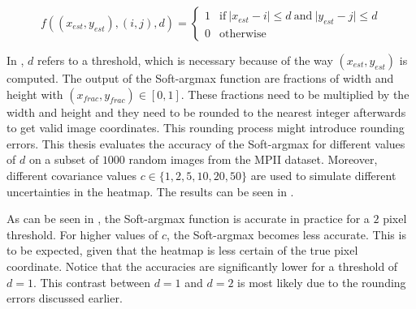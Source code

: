 \begin{equation}
    f((x_{est}, y_{est}), (i,j), d) =
    \begin{cases}
        1 & \text{if} ~ \lvert x_{est} - i \rvert \leq d ~ \text{and} ~ \lvert y_{est} - j \rvert \leq d \\
        0 & \text{otherwise}
    \end{cases}
    \label{eq:acc_softargmax}
\end{equation}

In , $d$ refers to a threshold, which is necessary because of the way $(x_{est}, y_{est})$ is computed.
The output of the Soft-argmax function are fractions of width and height with $(x_{frac}, y_{frac}) \in [0,1]$.
These fractions need to be multiplied by the width and height and they need to be rounded to the nearest integer afterwards to get valid image coordinates.
This rounding process might introduce rounding errors.
This thesis evaluates the accuracy of the Soft-argmax for different values of $d$ on a subset of $1000$ random images from the MPII dataset.
Moreover, different covariance values $c \in \{1, 2, 5, 10, 20, 50 \}$ are used to simulate different uncertainties in the heatmap.
The results can be seen in .

As can be seen in , the Soft-argmax function is accurate in practice for a $2$ pixel threshold.
For higher values of $c$, the Soft-argmax becomes less accurate.
This is to be expected, given that the heatmap is less certain of the true pixel coordinate.
Notice that the accuracies are significantly lower for a threshold of $d=1$.
This contrast between $d=1$ and $d=2$ is most likely due to the rounding errors discussed earlier.

\begin{table}[]
    \centering
    \caption{Mean average accuracy (in percent) of Soft-argmax when detecting ground truth coordinates from synthetic joint heatmaps. Threshold refers to the amount of pixels the estimate is allowed to deviate from the ground truth annotation. $c$ refers to the covariance used for creating the synthetic heatmaps. The large discrepancy between a threshold of $1$ and a threshold of $2$ is most likely due to rounding errors.}
    \label{tab:softargmax_numeric_eval}
\end{table}


